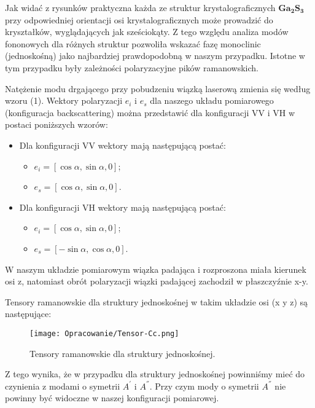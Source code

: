 Jak widać z rysunków praktyczna każda ze struktur krystalograficznych $\mathbf{Ga_{2}S_{3}}$ przy odpowiedniej orientacji osi krystalograficznych może prowadzić do kryształków, wyglądających jak sześciokąty. Z tego względu analiza modów fononowych dla różnych struktur pozwoliła wskazać fazę monoclinic (jednoskośną) jako najbardziej prawdopodobną w naszym przypadku. Istotne w tym przypadku były zależności polaryzacyjne pików ramanowskich.

Natężenie modu drgającego przy pobudzeniu wiązką laserową zmienia się według wzoru (1). Wektory polaryzacji $e_{i}$ i $e_{s}$ dla naszego układu pomiarowego (konfiguracja backscattering) można przedstawić dla konfiguracji VV i VH w postaci poniższych wzorów:
\begin{itemize}
	\item Dla konfiguracji VV wektory mają następującą postać:
	\begin{itemize}
		\item $e_{i} = [\cos \alpha, \sin \alpha, 0]$;
		\item $e_{s} = [\cos \alpha, \sin \alpha, 0]$.
	\end{itemize}
	\item Dla konfiguracji VH wektory mają następującą postać:
	\begin{itemize}
		\item $e_{i} = [\cos \alpha, \sin \alpha, 0]$;
		\item $e_{s} = [-\sin \alpha, \cos \alpha, 0]$.
	\end{itemize}
\end{itemize}

W naszym układzie pomiarowym wiązka padająca i rozproszona miała kierunek osi z, natomiast obrót polaryzacji wiązki padającej zachodził w płaszczyźnie x-y.

Tensory ramanowskie dla struktury jednoskośnej w takim układzie osi (x y z) są następujące:

\begin{figure}[H]
	\begin{center}
		\texttt{[image: Opracowanie/Tensor-Cc.png]}
		\caption{Tensory ramanowskie dla struktury jednoskośnej.}
	\end{center}
\end{figure}

Z tego wynika, że w przypadku dla struktury jednoskośnej powinniśmy mieć do czynienia z modami o symetrii $A^{'}$ i $A^{''}$. Przy czym mody o symetrii $A^{''}$ nie powinny być widoczne w naszej konfiguracji pomiarowej.

